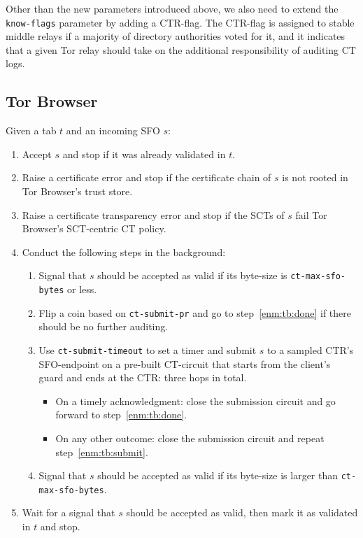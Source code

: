 Other than the new parameters introduced above, we also need to extend the
\texttt{know-flags} parameter by adding a CTR-flag.  The CTR-flag is 
assigned to stable middle relays if a majority of directory authorities voted
for it, and it indicates that a given Tor relay should take on the additional
responsibility of auditing CT logs.


\subsection{Tor Browser}
Given a tab $t$ and an incoming SFO $s$:
\begin{enumerate}
	\item Accept $s$ and stop if it was already validated in $t$.
	\item Raise a certificate error and stop if the certificate chain of $s$
		is not rooted in Tor Browser's trust store.
	\item Raise a certificate transparency error and stop if the SCTs of $s$
		fail Tor Browser's SCT-centric CT policy.
	\item Conduct the following steps in the background:
		\begin{enumerate}
			\item Signal that $s$ should be accepted as valid if its byte-size
				is \texttt{ct-max-sfo-bytes} or less.
			\item Flip a coin based on \texttt{ct-submit-pr} and go to
				step~\ref{enm:tb:done} if there should be no further auditing.
			\item\label{enm:tb:submit} Use \texttt{ct-submit-timeout} to set a
				timer and submit $s$ to a sampled CTR's SFO-endpoint on a
				pre-built CT-circuit that starts from the client's guard and
				ends at the CTR: three hops in total.
				\begin{itemize}
					\item On a timely acknowledgment: close the submission
						circuit and go forward to step~\ref{enm:tb:done}.
					\item On any other outcome: close the submission circuit and
						repeat step~\ref{enm:tb:submit}.
				\end{itemize}
			\item\label{enm:tb:done} Signal that $s$ should be accepted as valid
				if its byte-size is larger than \texttt{ct-max-sfo-bytes}.
		\end{enumerate}
	\item Wait for a signal that $s$ should be accepted as valid, then mark it
		as validated in $t$ and stop.
\end{enumerate}

